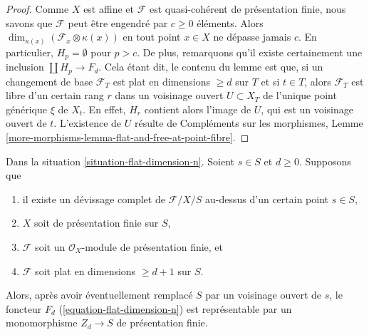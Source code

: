 \begin{proof}
Comme $X$ est affine et $\mathcal{F}$ est quasi-cohérent de présentation finie,
nous savons que $\mathcal{F}$ peut être engendré par $c \geq 0$ éléments.
Alors $\dim_{\kappa(x)}(\mathcal{F}_x \otimes \kappa(x))$
en tout point $x \in X$ ne dépasse jamais $c$. En particulier, $H_p = \emptyset$
pour $p > c$. De plus, remarquons qu'il existe certainement une inclusion
$\coprod H_p \to F_d$. Cela étant dit, le contenu
du lemme est que, si un changement de base $\mathcal{F}_T$ est plat en
dimensions $\geq d$ sur $T$ et si $t \in T$, alors $\mathcal{F}_T$ est
libre d'un certain rang $r$ dans un voisinage ouvert $U \subset X_T$
de l'unique point générique $\xi$ de $X_t$. En effet, $H_r$
contient alors l'image de $U$, qui est un voisinage ouvert de $t$.
L'existence de $U$ résulte de
Compléments sur les morphismes, Lemme
\ref{more-morphisms-lemma-flat-and-free-at-point-fibre}.
\end{proof}

\begin{lemma}
\label{lemma-flat-dimension-n-representable}
Dans la situation \ref{situation-flat-dimension-n}.
Soient $s \in S$ et $d \geq 0$. Supposons que
\begin{enumerate}
\item il existe un d\'evissage complet
de $\mathcal{F}/X/S$ au-dessus d'un certain point $s \in S$,
\item $X$ soit de présentation finie sur $S$,
\item $\mathcal{F}$ soit un $\mathcal{O}_X$-module de présentation finie, et
\item $\mathcal{F}$ soit plat en dimensions $\geq d + 1$ sur $S$.
\end{enumerate}
Alors, après avoir éventuellement remplacé $S$ par un voisinage ouvert
de $s$, le foncteur $F_d$ (\ref{equation-flat-dimension-n})
est représentable par un monomorphisme $Z_d \to S$ de présentation finie.
\end{lemma}

